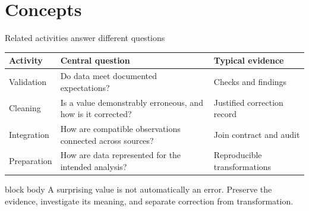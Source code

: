 \documentclass[10pt,aspectratio=169]{beamer}
\begin{document}
\section{Concepts}


\begin{frame}{Related activities answer different questions}

\scriptsize

\begin{tabularx}{\textwidth}{lXX}
\toprule
\textbf{Activity} & \textbf{Central question} & \textbf{Typical evidence} \\
\midrule
Validation & Do data meet documented expectations? & Checks and findings \\
Cleaning & Is a value demonstrably erroneous, and how is it corrected? & Justified correction record \\
Integration & How are compatible observations connected across sources? & Join contract and audit \\
Preparation & How are data represented for the intended analysis? & Reproducible transformations \\
\bottomrule
\end{tabularx}

\vspace{0.45cm}

\small

\begin{beamercolorbox}[rounded=true,sep=8pt]{block body}
A surprising value is not automatically an error. Preserve the evidence, investigate its meaning, and separate correction from transformation.
\end{beamercolorbox}

\end{frame}
\end{document}
